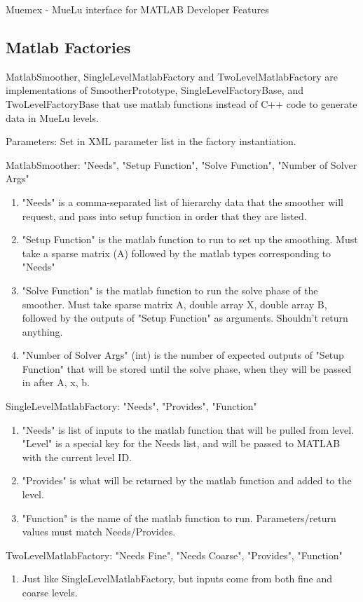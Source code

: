 Muemex - MueLu interface for MATLAB
Developer Features

\subsection{Matlab Factories}

MatlabSmoother, SingleLevelMatlabFactory and TwoLevelMatlabFactory are
implementations of SmootherPrototype, SingleLevelFactoryBase, and
TwoLevelFactoryBase that use matlab functions instead of C++ code
to generate data in MueLu levels.

Parameters: Set in XML parameter list in the factory instantiation.

\noindent
MatlabSmoother: "Needs", "Setup Function", "Solve Function", "Number of Solver
Args"
\begin{enumerate}
  \item "Needs" is a comma-separated list of hierarchy data that the smoother will
request, and pass into setup function in order that they are listed.
  \item "Setup Function" is the matlab function to run to set up the smoothing. Must
take a sparse matrix (A) followed by the matlab types corresponding to "Needs"
  \item "Solve Function" is the matlab function to run the solve phase of the
smoother. Must take sparse matrix A, double array X, double array B, followed by
the outputs of "Setup Function" as arguments. Shouldn't return anything.
  \item "Number of Solver Args" (int) is the number of expected outputs of "Setup
Function" that will be stored until the solve phase, when they will be
passed in after A, x, b.
\end{enumerate}

\noindent
SingleLevelMatlabFactory: "Needs", "Provides", "Function"
\begin{enumerate}
  \item "Needs" is list of inputs to the matlab function that will be pulled from
level. "Level" is a special key for the Needs list, and will be passed to MATLAB with the
current level ID.
  \item "Provides" is what will be returned by the matlab function and added to the
level.
  \item "Function" is the name of the matlab function to run. Parameters/return
values must match Needs/Provides.
\end{enumerate}

\noindent
TwoLevelMatlabFactory: "Needs Fine", "Needs Coarse", "Provides", "Function"
\begin{enumerate}
  \item Just like SingleLevelMatlabFactory, but inputs come from both fine and coarse
levels.
\end{enumerate}


